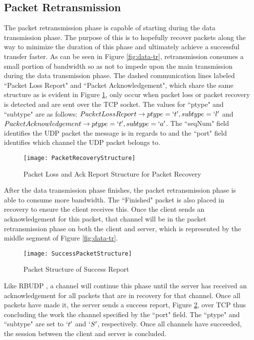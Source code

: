 \subsection{Packet Retransmission}\label{subsec:pack-retr}

The packet retransmission phase is capable of starting during the data transmission phase. The purpose of this is to hopefully recover packets along the way to minimize the duration of this phase and ultimately achieve a successful transfer faster. As can be seen in Figure \ref{fig:data-tr}, retransmission consumes a small portion of bandwidth so as not to impede upon the main transmission during the data transmission phase. The dashed communication lines labeled ``Packet Loss Report" and ``Packet Acknowledgement", which share the same structure as is evident in Figure \ref{fig:pack-rec-struct}, only occur when packet loss or packet recovery is detected and are sent over the TCP socket. The values for ``ptype" and ``subtype" are as follows: $Packet Loss Report \rightarrow ptype = \lq{t}\rq,subtype = \lq{l}\rq$ and $Packet Acknowledgement \rightarrow ptype = \lq{t}\rq,subtype = \lq{a}\rq$. The ``seqNum" field identifies the UDP packet the message is in regards to and the ``port" field identifies which channel the UDP packet belongs to.

\begin{figure}[ht]
\centering
\texttt{[image: PacketRecoveryStructure]}
\caption{Packet Loss and Ack Report Structure for Packet Recovery}
\label{fig:pack-rec-struct}
\end{figure}

After the data transmission phase finishes, the packet retransmission phase is able to consume more bandwidth. The ``Finished" packet is also placed in recovery to ensure the client receives this. Once the client sends an acknowledgement for this packet, that channel will be in the packet retransmission phase on both the client and server, which is represented by the middle segment of Figure \ref{fig:data-tr}.

\begin{figure}[ht]
\centering
\texttt{[image: SuccessPacketStructure]}
\caption{Packet Structure of Success Report}
\label{fig:success-struct}
\end{figure}

Like RBUDP \cite{He2002}, a channel will continue this phase until the server has received an acknowledgement for all packets that are in recovery for that channel. Once all packets have made it, the server sends a success report, Figure \ref{fig:success-struct}, over TCP thus concluding the work the channel specified by the ``port" field. The ``ptype" and ``subtype" are set to $`t'$ and $`S'$, respectively. Once all channels have succeeded, the session between the client and server is concluded.